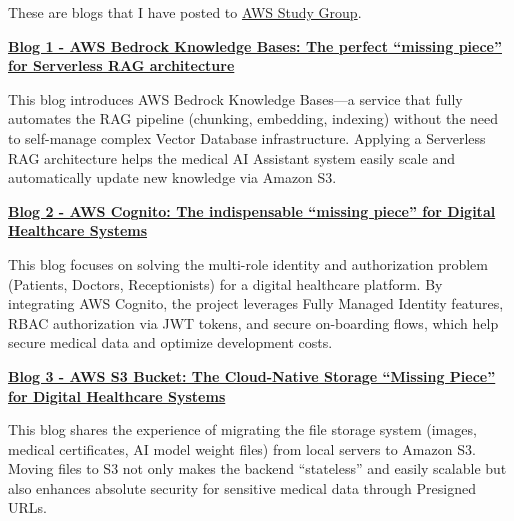 These are blogs that I have posted to
\href{https://www.facebook.com/groups/awsstudygroupfcj}{AWS Study
Group}.

\vspace{0.5em}\noindent\textbf{\texorpdfstring{\href{3.1-Blog1/}{Blog 1 - AWS Bedrock
Knowledge Bases: The perfect ``missing piece'' for Serverless RAG
architecture}}{Blog 1 - AWS Bedrock Knowledge Bases: The perfect ``missing piece'' for Serverless RAG architecture}}

This blog introduces AWS Bedrock Knowledge Bases---a service that fully
automates the RAG pipeline (chunking, embedding, indexing) without the
need to self-manage complex Vector Database infrastructure. Applying a
Serverless RAG architecture helps the medical AI Assistant system easily
scale and automatically update new knowledge via Amazon S3.

\vspace{0.5em}\noindent\textbf{\texorpdfstring{\href{3.2-Blog2/}{Blog 2 - AWS Cognito:
The indispensable ``missing piece'' for Digital Healthcare
Systems}}{Blog 2 - AWS Cognito: The indispensable ``missing piece'' for Digital Healthcare Systems}}

This blog focuses on solving the multi-role identity and authorization
problem (Patients, Doctors, Receptionists) for a digital healthcare
platform. By integrating AWS Cognito, the project leverages Fully
Managed Identity features, RBAC authorization via JWT tokens, and secure
on-boarding flows, which help secure medical data and optimize
development costs.

\vspace{0.5em}\noindent\textbf{\texorpdfstring{\href{3.3-Blog3/}{Blog 3 - AWS S3 Bucket:
The Cloud-Native Storage ``Missing Piece'' for Digital Healthcare
Systems}}{Blog 3 - AWS S3 Bucket: The Cloud-Native Storage ``Missing Piece'' for Digital Healthcare Systems}}

This blog shares the experience of migrating the file storage system
(images, medical certificates, AI model weight files) from local servers
to Amazon S3. Moving files to S3 not only makes the backend
``stateless'' and easily scalable but also enhances absolute security
for sensitive medical data through Presigned URLs.
